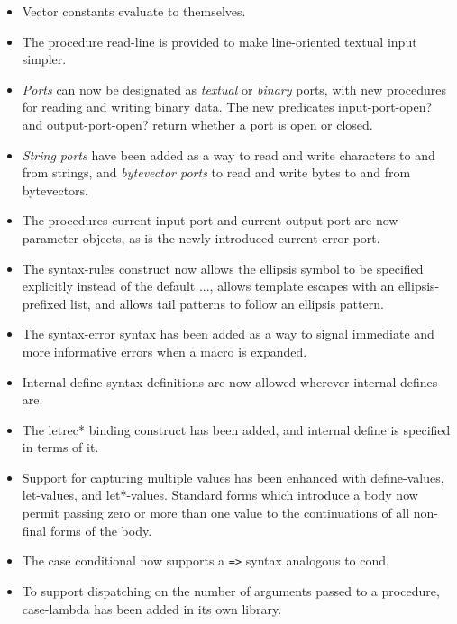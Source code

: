\begin{itemize}
\item Vector constants evaluate to themselves.

\item The procedure {\cf read-line} is provided to make line-oriented textual input
simpler.

\item {\em Ports} can now be designated as {\em textual} or {\em
binary} ports, with new procedures for reading and writing binary
data.
The new predicates {\cf input-port-open?} and {\cf output-port-open?} return whether a port is open or closed.

\item {\em String ports} have been added as a way to read and write
characters to and from strings, and {\em bytevector ports} to read
and write bytes to and from bytevectors.

\item The procedures {\cf current-input-port} and {\cf current-output-port} are now
parameter objects, as is the newly introduced {\cf
current-error-port}.

\item The {\cf syntax-rules} construct now allows
the ellipsis symbol to be specified explicitly instead of the default
{\cf ...}, allows template escapes with an ellipsis-prefixed list, and
allows tail patterns to follow an ellipsis pattern.

\item The {\cf syntax-error} syntax has been added as a way to signal immediate
and more informative errors when a macro is expanded.

\item Internal {\cf define-syntax} definitions are now allowed wherever
internal {\cf define}s are.

\item The {\cf letrec*} binding construct has been added, and internal {\cf define} 
is specified in terms of it.

\item Support for capturing multiple values has been enhanced with {\cf
define-values}, {\cf let-values}, and {\cf let*-values}.
Standard forms which introduce a body now permit passing zero or more than
one value to the continuations of all non-final forms of the body.

\item The {\cf case} conditional now supports a {\tt =>} syntax analogous to {\cf cond}.

\item To support dispatching on the number of arguments passed to a
procedure, {\cf case-lambda} has been added in its own library.


\end{itemize}
